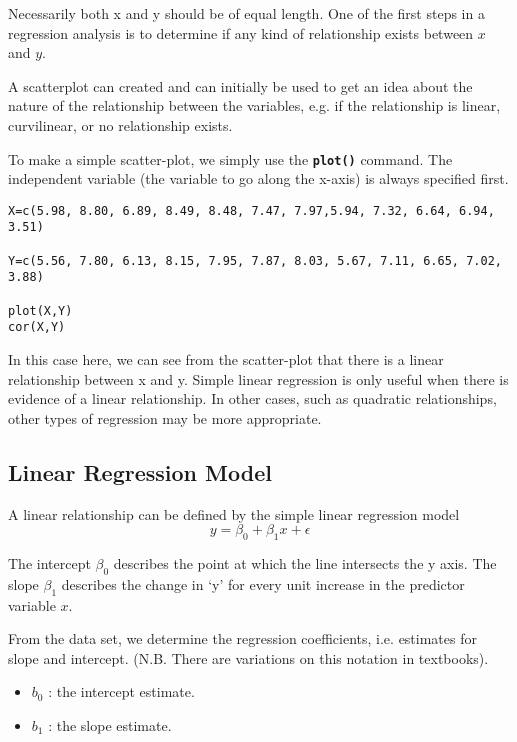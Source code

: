 Necessarily both x and y should be of equal length. One of the first steps in a regression analysis is to determine if any kind of relationship exists between $x$ and $y$.

A scatterplot can created and can initially be used to get an idea about the nature of the relationship between the variables, e.g. if the relationship is linear, curvilinear, or no relationship exists.

To make a simple scatter-plot, we simply use the \texttt{\textbf{plot()}} command. The independent variable (the variable to go along the x-axis) is always specified first.



\begin{framed}
\begin{verbatim}
X=c(5.98, 8.80, 6.89, 8.49, 8.48, 7.47, 7.97,5.94, 7.32, 6.64, 6.94, 3.51)

Y=c(5.56, 7.80, 6.13, 8.15, 7.95, 7.87, 8.03, 5.67, 7.11, 6.65, 7.02, 3.88)

plot(X,Y)
cor(X,Y)
\end{verbatim}
\end{framed}
In this case here, we can see from the scatter-plot that there is a linear relationship between x and y.
Simple linear regression is only useful when there is evidence of a linear relationship. In other cases, such as quadratic relationships, other types of regression may be more appropriate.

\subsection{Linear Regression Model}

A linear relationship can be defined by the simple linear regression model
\[y = \beta_0 + \beta_1x + \epsilon\]

The intercept $\beta_0$ describes the point at which the line intersects the y axis.
The slope $\beta_1$ describes the change in ‘y’ for every unit increase in the predictor variable $x$.

From the data set, we determine the regression coefficients, i.e. estimates for slope and intercept. (N.B. There are variations on this notation in textbooks).

\begin{itemize}	\item $b_0$ : the intercept estimate.
\item	$b_1$ : the slope estimate.
\end{itemize}

